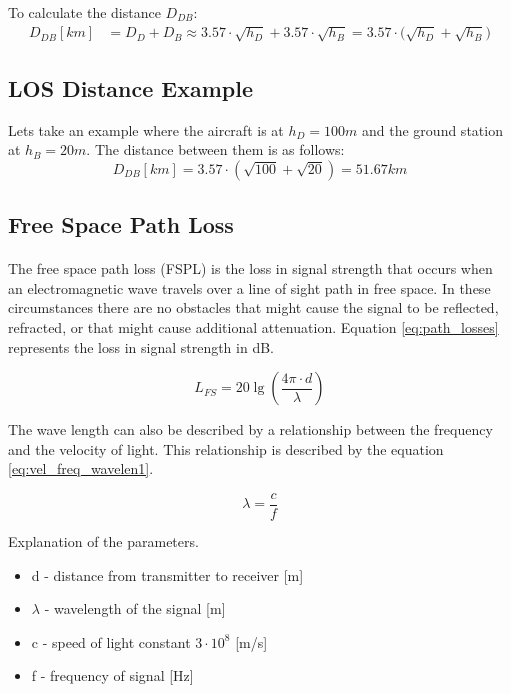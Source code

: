 To calculate the distance $D_{DB}$:
\begin{align}
	D_{DB}[km]	 &= D_D + D_B \approx 3.57\cdot \sqrt{h_D} + 3.57\cdot \sqrt{h_B} = {3.57\cdot (\sqrt{h_D} + \sqrt{h_B}} )
\end{align}

\subsection{LOS Distance Example}
Lets take an example where the aircraft is at $h_D = 100m$ and the ground station at $h_B = 20m$. The distance between them is as follows:
\begin{equation*}
	D_{DB}[km] = 3.57\cdot (\sqrt{100} + \sqrt{20}) = 51.67km
\end{equation*}

\subsection{Free Space Path Loss}\label{subsec:path_loss}
\paragraph{}
The free space path loss (FSPL) is the loss in signal strength that occurs when an electromagnetic wave travels over a line of sight path in free space. In these circumstances there are no obstacles that might cause the signal to be reflected, refracted, or that might cause additional attenuation. Equation \ref{eq:path_losses} represents the loss in signal strength in dB.

\begin{equation}\label{eq:path_losses}
	L_{FS} = 20\lg\left (\frac{4\pi \cdot d}{\lambda} \right)
\end{equation}

The wave length can also be described by a relationship between the frequency and the velocity of light. This relationship is described by the equation \ref{eq:vel_freq_wavelen1}.

\begin{equation}\label{eq:vel_freq_wavelen1}
	\lambda = \frac{c}{f}
\end{equation}

Explanation of the parameters.
\begin{itemize}
	\item d - distance from transmitter to receiver [m]
	\item $\lambda$ - wavelength of the signal [m]
	\item c - speed of light constant $3\cdot 10^8$ [m/s] 
	\item f - frequency of signal [Hz]
\end{itemize}

